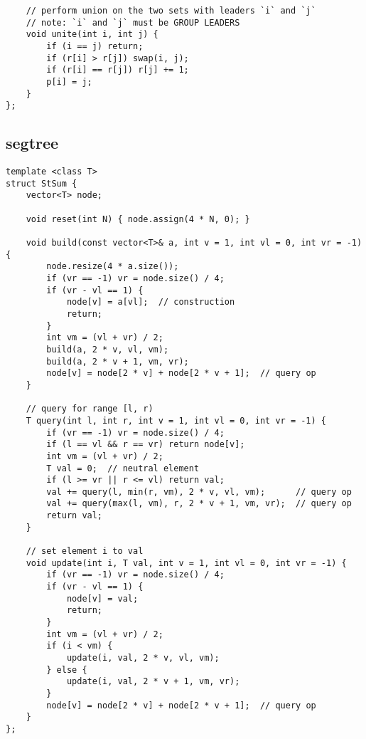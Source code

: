 \documentclass[twoside]{article}
\begin{document}
\begin{multicols*}{2}
\begin{verbatim}
    // perform union on the two sets with leaders `i` and `j`
    // note: `i` and `j` must be GROUP LEADERS
    void unite(int i, int j) {
        if (i == j) return;
        if (r[i] > r[j]) swap(i, j);
        if (r[i] == r[j]) r[j] += 1;
        p[i] = j;
    }
};
\end{verbatim}

{
\subsection*{segtree}
}
\begin{verbatim}
template <class T>
struct StSum {
    vector<T> node;

    void reset(int N) { node.assign(4 * N, 0); }

    void build(const vector<T>& a, int v = 1, int vl = 0, int vr = -1) {
        node.resize(4 * a.size());
        if (vr == -1) vr = node.size() / 4;
        if (vr - vl == 1) {
            node[v] = a[vl];  // construction
            return;
        }
        int vm = (vl + vr) / 2;
        build(a, 2 * v, vl, vm);
        build(a, 2 * v + 1, vm, vr);
        node[v] = node[2 * v] + node[2 * v + 1];  // query op
    }

    // query for range [l, r)
    T query(int l, int r, int v = 1, int vl = 0, int vr = -1) {
        if (vr == -1) vr = node.size() / 4;
        if (l == vl && r == vr) return node[v];
        int vm = (vl + vr) / 2;
        T val = 0;  // neutral element
        if (l >= vr || r <= vl) return val;
        val += query(l, min(r, vm), 2 * v, vl, vm);      // query op
        val += query(max(l, vm), r, 2 * v + 1, vm, vr);  // query op
        return val;
    }

    // set element i to val
    void update(int i, T val, int v = 1, int vl = 0, int vr = -1) {
        if (vr == -1) vr = node.size() / 4;
        if (vr - vl == 1) {
            node[v] = val;
            return;
        }
        int vm = (vl + vr) / 2;
        if (i < vm) {
            update(i, val, 2 * v, vl, vm);
        } else {
            update(i, val, 2 * v + 1, vm, vr);
        }
        node[v] = node[2 * v] + node[2 * v + 1];  // query op
    }
};


\end{verbatim}
\end{multicols*}
\end{document}
